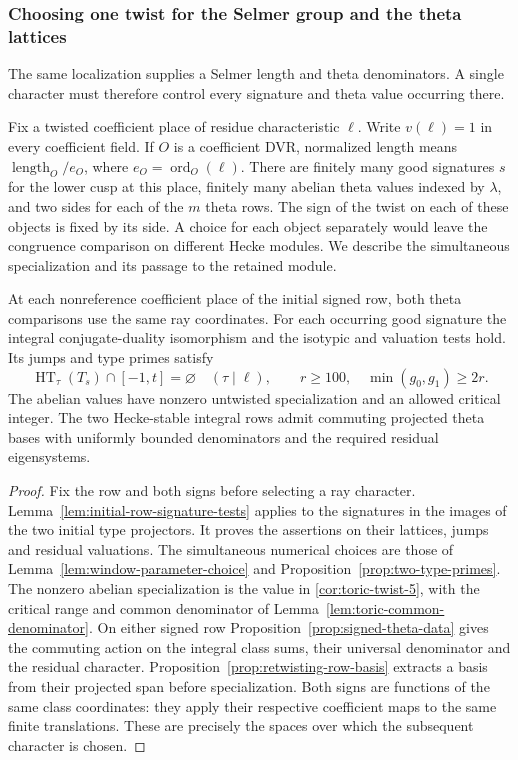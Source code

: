 \subsubsection*{Choosing one twist for the Selmer group and the theta lattices}
\label{subsec:retained-twist}
\hypertarget{source-retained-twist}{}

The same localization supplies a Selmer length and theta denominators. A single character must therefore control every signature and theta value occurring there.

Fix a twisted coefficient place of residue characteristic \(\ell\).
Write \(v(\ell)=1\) in every coefficient field. If \(O\) is a
coefficient DVR, normalized length means \(\operatorname{length}_O/e_O\),
where \(e_O=\operatorname{ord}_O(\ell)\). There are finitely many
good signatures \(s\) for the lower cusp at this place, finitely
many abelian theta values indexed by \(\lambda\), and two sides
for each of the \(m\) theta rows. The sign of the twist on each
of these objects is fixed by its side. A choice for each object
separately would leave the congruence comparison on different
Hecke modules. We describe the simultaneous specialization and
its passage to the retained module.

\begin{established}\label{hyp:simultaneous-retained-twist}
At each nonreference coefficient place of the initial signed row, both theta comparisons use the same ray coordinates. For each occurring good signature the integral conjugate-duality isomorphism and the isotypic and valuation tests hold. Its jumps and type primes satisfy
\[
 \operatorname{HT}_\tau(T_s)\cap[-1,t]=\varnothing
 \quad(\tau\mid\ell),\qquad
 r\ge100,\quad\min(g_0,g_1)\ge2r .
\] The abelian values have nonzero untwisted specialization and an allowed critical integer. The two Hecke-stable integral rows admit commuting projected theta bases with uniformly bounded denominators and the required residual eigensystems.
\end{established}
\begin{proof}
Fix the row and both signs before selecting a ray character. Lemma~\ref{lem:initial-row-signature-tests} applies to the signatures in the images of the two initial type projectors. It proves the assertions on their lattices, jumps and residual valuations. The simultaneous numerical choices are those of Lemma~\ref{lem:window-parameter-choice} and Proposition~\ref{prop:two-type-primes}. The nonzero abelian specialization is the value in \ref{cor:toric-twist-5}, with the critical range and common denominator of Lemma~\ref{lem:toric-common-denominator}. On either signed row Proposition~\ref{prop:signed-theta-data} gives the commuting action on the integral class sums, their universal denominator and the residual character. Proposition~\ref{prop:retwisting-row-basis} extracts a basis from their projected span before specialization. Both signs are functions of the same class coordinates: they apply their respective coefficient maps to the same finite translations. These are precisely the spaces over which the subsequent character is chosen.
\end{proof}

